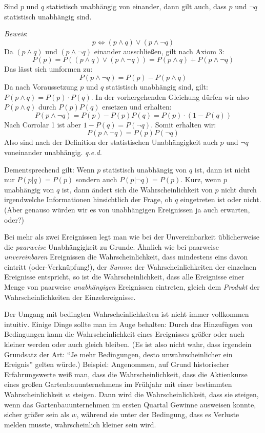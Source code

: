 Sind $p$ und $q$ statistisch unabhängig von einander, dann gilt auch, dass $p$
und $\neg q$ statistisch unabhängig sind. 

{\em Beweis}: 
\[ p \Leftrightarrow (p \wedge q) \vee (p \wedge \neg q) \] 
Da $(p \wedge q)$ und $(p \wedge \neg q)$ einander ausschließen, gilt nach Axiom
3:
\[ P(p) = P((p \wedge q) \vee (p \wedge \neg q)) =
   P(p \wedge q) + P(p \wedge \neg q) \]
Das lässt sich umformen zu:
\[ P(p \wedge \neg q) = P(p) - P(p \wedge q) \]
Da nach Voraussetzung $p$ und $q$ statistisch unabhängig sind, gilt: 
$P(p \wedge q) = P(p)\cdot P(q)$. In der vorhergehenden Gleichung dürfen wir
also $P(p \wedge q)$ durch $P(p)P(q)$ ersetzen und erhalten:
\[ P(p \wedge \neg q) = P(p) - P(p)P(q) = P(p)\cdot (1 - P(q)) \]
Nach Corrolar 1 ist aber $1 - P(q) = P(\neg q)$. Somit erhalten wir:
\[ P(p \wedge \neg q) = P(p)P(\neg q) \]
Also sind nach der Definition der statistischen Unabhängigkeit auch
$p$ und $\neg q$ voneinander unabhängig. {\em q.e.d.}

Dementsprechend gilt: Wenn $p$ statistisch unabhängig von $q$ ist, dann ist
nicht nur $P(p|q) = P(p)$ sondern auch $P(p|\neg q) = P(p)$. Kurz, wenn $p$
unabhängig von $q$ ist, dann ändert sich die Wahrscheinlichkeit von $p$ nicht
durch irgendwelche Informationen hinsichtlich der Frage, ob $q$ eingetreten ist
oder nicht. (Aber genauso würden wir es von unabhängigen Ereignissen ja auch
erwarten, oder?) 

Bei mehr als zwei Ereignissen legt man wie bei der Unvereinbarkeit üblicherweise
die {\em paarweise} Unabhängigkeit zu Grunde. Ähnlich wie bei paarweise {\em
unvereinbaren} Ereignissen die Wahrscheinlichkeit, dass mindestens eins davon
eintritt (oder-Verknüpfung!), der {\em Summe} der Wahrscheinlichkeiten der
einzelnen Ereignisse entspricht, so ist die Wahrscheinlichkeit, dass alle
Ereignisse einer Menge von paarweise {\em unabhängigen} Ereignissen eintreten,
gleich dem {\em Produkt} der Wahrscheinlichkeiten der Einzelereignisse.

Der Umgang mit bedingten Wahrscheinlichkeiten ist nicht immer vollkommen
intuitiv. Einige Dinge sollte man
im Auge behalten: Durch das Hinzufügen von Bedingungen kann die
Wahrscheinlichkeit eines Ereignisses größer oder auch kleiner werden oder auch
gleich bleiben. (Es ist also nicht wahr, dass irgendein Grundsatz der Art: "`Je
mehr Bedingungen, desto unwahrscheinlicher ein Ereignis"' gelten würde.)
Beispiel: Angenommen, auf Grund historischer Erfahrungswerte weiß man, dass die
Wahrscheinlichkeit, dass die Aktienkurse eines großen Gartenbauunternehmens im
Frühjahr mit einer bestimmten Wahrscheinlichkeit $w$ steigen. Dann wird die
Wahrscheinlichkeit, dass sie steigen, wenn das Gartenbauunternehmen im ersten
Quartal Gewinne ausweisen konnte, sicher größer sein als $w$, während sie unter
der Bedingung, dass es Verluste melden musste, wahrscheinlich kleiner sein wird.

